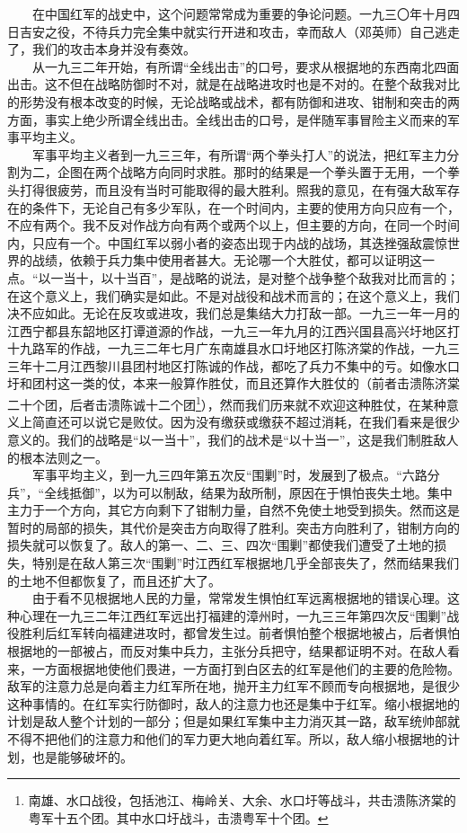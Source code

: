 \documentclass[cn,11pt,chinese]{elegantbook}
\begin{document}
　　在中国红军的战史中，这个问题常常成为重要的争论问题。一九三〇年十月四日吉安之役，不待兵力完全集中就实行开进和攻击，幸而敌人（邓英师）自己逃走了，我们的攻击本身并没有奏效。\\
　　从一九三二年开始，有所谓“全线出击”的口号，要求从根据地的东西南北四面出击。这不但在战略防御时不对，就是在战略进攻时也是不对的。在整个敌我对比的形势没有根本改变的时候，无论战略或战术，都有防御和进攻、钳制和突击的两方面，事实上绝少所谓全线出击。全线出击的口号，是伴随军事冒险主义而来的军事平均主义。\\
　　军事平均主义者到一九三三年，有所谓“两个拳头打人”的说法，把红军主力分割为二，企图在两个战略方向同时求胜。那时的结果是一个拳头置于无用，一个拳头打得很疲劳，而且没有当时可能取得的最大胜利。照我的意见，在有强大敌军存在的条件下，无论自己有多少军队，在一个时间内，主要的使用方向只应有一个，不应有两个。我不反对作战方向有两个或两个以上，但主要的方向，在同一个时间内，只应有一个。中国红军以弱小者的姿态出现于内战的战场，其迭挫强敌震惊世界的战绩，依赖于兵力集中使用者甚大。无论哪一个大胜仗，都可以证明这一点。“以一当十，以十当百”，是战略的说法，是对整个战争整个敌我对比而言的；在这个意义上，我们确实是如此。不是对战役和战术而言的；在这个意义上，我们决不应如此。无论在反攻或进攻，我们总是集结大力打敌一部。一九三一年一月的江西宁都县东韶地区打谭道源的作战，一九三一年九月的江西兴国县高兴圩地区打十九路军的作战，一九三二年七月广东南雄县水口圩地区打陈济棠的作战，一九三三年十二月江西黎川县团村地区打陈诚的作战，都吃了兵力不集中的亏。如像水口圩和团村这一类的仗，本来一般算作胜仗，而且还算作大胜仗的（前者击溃陈济棠二十个团，后者击溃陈诚十二个团\footnote[51]{ 南雄、水口战役，包括池江、梅岭关、大余、水口圩等战斗，共击溃陈济棠的粤军十五个团。其中水口圩战斗，击溃粤军十个团。}），然而我们历来就不欢迎这种胜仗，在某种意义上简直还可以说它是败仗。因为没有缴获或缴获不超过消耗，在我们看来是很少意义的。我们的战略是“以一当十”，我们的战术是“以十当一”，这是我们制胜敌人的根本法则之一。\\
　　军事平均主义，到一九三四年第五次反“围剿”时，发展到了极点。“六路分兵”，“全线抵御”，以为可以制敌，结果为敌所制，原因在于惧怕丧失土地。集中主力于一个方向，其它方向剩下了钳制力量，自然不免使土地受到损失。然而这是暂时的局部的损失，其代价是突击方向取得了胜利。突击方向胜利了，钳制方向的损失就可以恢复了。敌人的第一、二、三、四次“围剿”都使我们遭受了土地的损失，特别是在敌人第三次“围剿”时江西红军根据地几乎全部丧失了，然而结果我们的土地不但都恢复了，而且还扩大了。\\
　　由于看不见根据地人民的力量，常常发生惧怕红军远离根据地的错误心理。这种心理在一九三二年江西红军远出打福建的漳州时，一九三三年第四次反“围剿”战役胜利后红军转向福建进攻时，都曾发生过。前者惧怕整个根据地被占，后者惧怕根据地的一部被占，而反对集中兵力，主张分兵把守，结果都证明不对。在敌人看来，一方面根据地使他们畏进，一方面打到白区去的红军是他们的主要的危险物。敌军的注意力总是向着主力红军所在地，抛开主力红军不顾而专向根据地，是很少这种事情的。在红军实行防御时，敌人的注意力也还是集中于红军。缩小根据地的计划是敌人整个计划的一部分；但是如果红军集中主力消灭其一路，敌军统帅部就不得不把他们的注意力和他们的军力更大地向着红军。所以，敌人缩小根据地的计划，也是能够破坏的。\\
\end{document}
